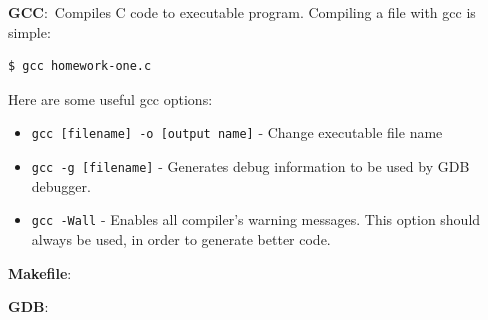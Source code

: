 \documentclass[nobib]{tufte-handout}
\newcommand{\defn}[2]{\noindent\textbf{#1}:\ #2}
\begin{document}
\defn{GCC}{Compiles C code to executable program.}
Compiling a file with gcc is simple:
\begin{lstlisting}[language=bash,caption=Using gcc]
   $ gcc homework-one.c
\end{lstlisting}
Here are some useful gcc options:
\begin{itemize}
   \item \texttt{gcc [filename] -o [output name]} - Change executable file name
   \item \texttt{gcc -g [filename]} - Generates debug information to be used by GDB debugger.
   \item \texttt{gcc -Wall} - Enables all compiler's warning messages. This option should always be used, in order to generate better code.
\end{itemize}



\defn{Makefile}{}

\defn{GDB}{}
\end{document}
